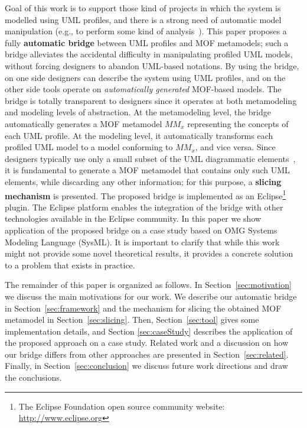 Goal of this work is to support those kind of projects in which the system is modelled using UML profiles, and there is a strong need of automatic model manipulation (e.g., to perform some kind of analysis~\cite{UMLprofilesAnalysis}).
This paper proposes a fully \textbf{automatic bridge} between UML profiles and MOF metamodels; such a bridge alleviates the accidental difficulty in manipulating profiled UML models, without forcing designers to abandon UML-based notations.
By using the bridge, on one side designers can describe the system using UML profiles, and on the other side tools operate
on \textit{automatically generated} MOF-based models.
The bridge is totally transparent to designers since it operates at both metamodeling and modeling levels of abstraction.
At the metamodeling level, the bridge automatically generates a MOF metamodel $MM_x$ representing the concepts of each UML profile.
At the modeling level, it automatically transforms each profiled UML model to a model conforming to $MM_x$, and vice versa.
Since designers typically use only a small subset of the UML diagrammatic elements~\cite{france},
it is fundamental to generate a MOF metamodel that contains only such UML elements, while discarding any other information; for this purpose, a \textbf{slicing mechanism} is presented. The proposed bridge is implemented as an Eclipse\footnote{The Eclipse Foundation open source community website: \small{\url{http://www.eclipse.org}}} plugin. The Eclipse platform enables the integration of the bridge
with other technologies available in the Eclipse community. In this paper we show application of the proposed bridge on a case study based on OMG Systems Modeling Language (SysML). It is important to clarify that while this work might not provide some novel theoretical results, it provides a concrete solution to a problem that exists in practice.

The remainder of this paper is organized as follows. In Section~\ref{sec:motivation} we discuss the main motivations for our work.
We describe our automatic bridge in Section~\ref{sec:framework} and the mechanism for slicing the obtained MOF metamodel
in Section~\ref{sec:slicing}. Then, Section~\ref{sec:tool} gives some implementation details, and Section \ref{sec:caseStudy} describes the application of the proposed approach on a case study. Related work and a discussion on how our bridge differs from other approaches
are presented in Section~\ref{sec:related}. Finally, in Section~\ref{sec:conclusion} we discuss future work directions and draw the conclusions.

